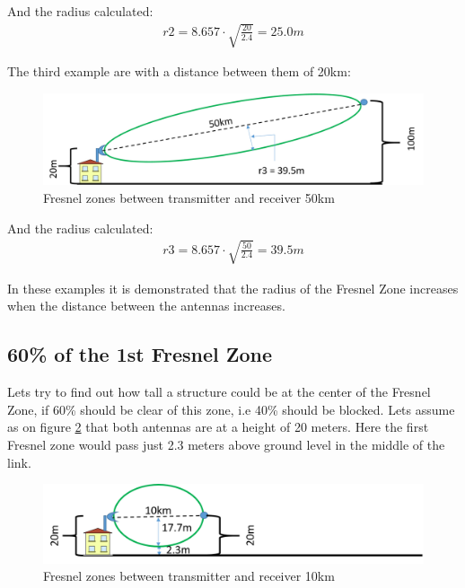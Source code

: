 And the radius calculated:
\begin{align*}
r2 = 8.657\cdot \sqrt{\frac{20}{2.4}} = 25.0m
\end{align*}

The third example are with a distance between them of 20km:

\begin{figure}[H]
	\centering
	\includegraphics[scale=0.50]{figures/fresnel_50km.png}
	\caption{Fresnel zones between transmitter and receiver 50km}
	\label{fig:fresnel_zones_50km}
\end{figure}  

And the radius calculated:
\begin{align*}
r3 = 8.657\cdot \sqrt{\frac{50}{2.4}} = 39.5m
\end{align*}

\noindent In these examples it is demonstrated that the radius of the Fresnel Zone increases when the distance between the antennas increases.

\subsection{60\% of the 1st Fresnel Zone}
Lets try to find out how tall a structure could be at the center of the Fresnel Zone, if 60\% should be clear of this zone, i.e 40\% should be blocked. Lets assume as on figure \ref{fig:fresnel_zones_10km_height} that both antennas are at a height of 20 meters. Here the first Fresnel zone would pass just 2.3 meters above ground level in the middle of the link. 

\begin{figure}[H]
	\centering
	\includegraphics[scale=0.50]{figures/fresnel_10km_height.png}
	\caption{Fresnel zones between transmitter and receiver 10km}
	\label{fig:fresnel_zones_10km_height}
\end{figure}  

